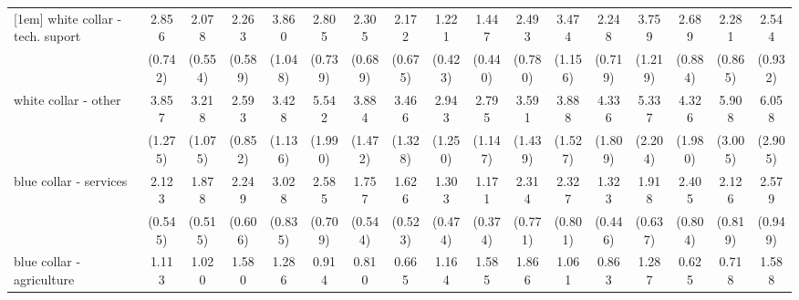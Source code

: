 {\begin{tabular}{l*{16}{c}}
[1em]
white collar - tech. suport&       2.856\sym{***}&       2.078\sym{**} &       2.263\sym{**} &       3.860\sym{***}&       2.805\sym{***}&       2.305\sym{**} &       2.172\sym{*}  &       1.221         &       1.447         &       2.493\sym{**} &       3.474\sym{***}&       2.248\sym{*}  &       3.759\sym{***}&       2.689\sym{**} &       2.281\sym{*}  &       2.544\sym{*}  \\
                    &     (0.742)         &     (0.554)         &     (0.589)         &     (1.048)         &     (0.739)         &     (0.689)         &     (0.675)         &     (0.423)         &     (0.440)         &     (0.780)         &     (1.156)         &     (0.719)         &     (1.219)         &     (0.884)         &     (0.865)         &     (0.932)         \\
[1em]
white collar - other&       3.857\sym{***}&       3.218\sym{***}&       2.593\sym{**} &       3.428\sym{***}&       5.542\sym{***}&       3.884\sym{***}&       3.466\sym{**} &       2.943\sym{*}  &       2.795\sym{*}  &       3.591\sym{**} &       3.888\sym{***}&       4.336\sym{***}&       5.337\sym{***}&       4.326\sym{**} &       5.908\sym{***}&       6.058\sym{***}\\
                    &     (1.275)         &     (1.075)         &     (0.852)         &     (1.136)         &     (1.990)         &     (1.472)         &     (1.328)         &     (1.250)         &     (1.147)         &     (1.439)         &     (1.527)         &     (1.809)         &     (2.204)         &     (1.980)         &     (3.005)         &     (2.905)         \\
[1em]
blue collar - services&       2.123\sym{**} &       1.878\sym{*}  &       2.249\sym{**} &       3.028\sym{***}&       2.585\sym{***}&       1.757         &       1.626         &       1.303         &       1.171         &       2.314\sym{*}  &       2.327\sym{*}  &       1.323         &       1.918\sym{*}  &       2.405\sym{**} &       2.126         &       2.579\sym{**} \\
                    &     (0.545)         &     (0.515)         &     (0.606)         &     (0.835)         &     (0.709)         &     (0.544)         &     (0.523)         &     (0.474)         &     (0.374)         &     (0.771)         &     (0.801)         &     (0.446)         &     (0.637)         &     (0.804)         &     (0.819)         &     (0.949)         \\
[1em]
blue collar - agriculture&       1.113         &       1.020         &       1.580         &       1.286         &       0.914         &       0.810         &       0.665         &       1.164         &       1.585         &       1.866         &       1.061         &       0.863         &       1.287         &       0.625         &       0.718         &       1.588         \\

\end{tabular}}
